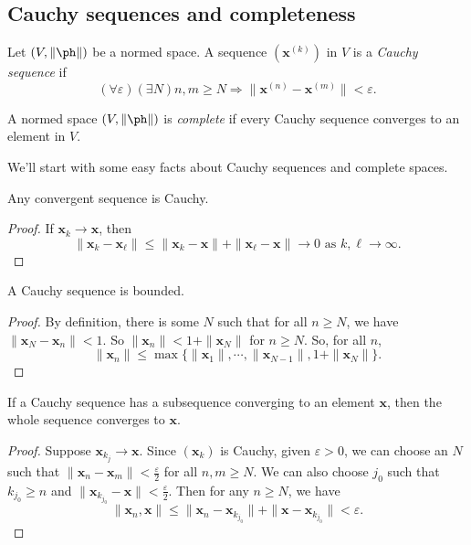 \documentclass[a4paper]{article}
\begin{document}
\subsection{Cauchy sequences and completeness}
\begin{defi}
  Let $(V, \|\ph \|)$ be a normed space. A sequence $(\mathbf{x}^{(k)})$ in $V$ is a \emph{Cauchy sequence} if
  \[
    (\forall \varepsilon)(\exists N)n, m \geq N \Rightarrow \|\mathbf{x}^{(n)} - \mathbf{x}^{(m)}\| < \varepsilon.
  \]
\end{defi}

\begin{defi}
  A normed space $(V, \|\ph\|)$ is \emph{complete} if every Cauchy sequence converges to an element in $V$.
\end{defi}

We'll start with some easy facts about Cauchy sequences and complete spaces.
\begin{prop}
  Any convergent sequence is Cauchy.
\end{prop}

\begin{proof}
  If $\mathbf{x}_k \to \mathbf{x}$, then
  \[
    \|\mathbf{x}_k - \mathbf{x}_\ell\| \leq \|\mathbf{x}_k - \mathbf{x}\| + \|\mathbf{x}_\ell - \mathbf{x}\| \to 0 \text{ as }k, \ell \to \infty.
  \]
\end{proof}

\begin{prop}
  A Cauchy sequence is bounded.
\end{prop}

\begin{proof}
  By definition, there is some $N$ such that for all $n \geq N$, we have $\|\mathbf{x}_N - \mathbf{x}_n\| < 1$. So $\|\mathbf{x}_n\| < 1 + \|\mathbf{x}_N\|$ for $n \geq N$. So, for all $n$,
  \[
    \|\mathbf{x}_n\| \leq \max\{\|\mathbf{x}_1\|, \cdots, \|\mathbf{x}_{N - 1}\|, 1 + \|\mathbf{x}_N\|\}.
  \]
\end{proof}

\begin{prop}
  If a Cauchy sequence has a subsequence converging to an element $\mathbf{x}$, then the whole sequence converges to $\mathbf{x}$.
\end{prop}

\begin{proof}
  Suppose $\mathbf{x}_{k_j} \to \mathbf{x}$. Since $(\mathbf{x}_k)$ is Cauchy, given $\varepsilon > 0$, we can choose an $N$ such that $\|\mathbf{x}_n - \mathbf{x}_m\| < \frac{\varepsilon}{2}$ for all $n, m \geq N$. We can also choose $j_0$ such that $k_{j_0} \geq n$ and $\|\mathbf{x}_{k_{j_0}} - \mathbf{x}\| < \frac{\varepsilon}{2}$. Then for any $n \geq N$, we have
  \[
    \|\mathbf{x}_n, \mathbf{x}\| \leq \|\mathbf{x}_n - \mathbf{x}_{k_{j_0}}\| + \|\mathbf{x} - \mathbf{x}_{k_{j_0}}\| < \varepsilon.
  \]
\end{proof}
\end{document}
